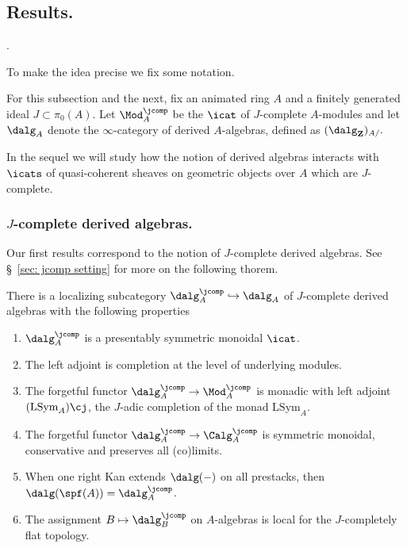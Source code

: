 \documentclass[10pt,reqno]{amsart}
\numberwithin{equation}{section}
\newcommand{\ZZ}{\mathbf{Z}}
\newcommand{\Sym}{\mathrm{Sym}}
\renewcommand{\L}{\mathrm{L}}
\newcommand{\into}{\hookrightarrow}
\begin{document}
\subsection{Results.}\label{sec: results}





.

To make the idea precise we fix some notation.

\begin{notation}\label{notation in intro.}
    For this subsection and the next, fix an animated ring $A$ and a finitely generated ideal $J\subset \pi_0(A).$ Let $\Mod_A^\jcomp$ be the $\icat$ of $J$-complete $A$-modules and let $\dalg_A$ denote the $\infty$-category of derived $A$-algebras, defined as $(\dalg_\ZZ)_{A/}.$
\end{notation}

In the sequel we will study how the notion of derived algebras interacts with $\icats$ of quasi-coherent sheaves on geometric objects over $A$ which are $J$-complete.

\subsubsection{$J$-complete derived algebras.}
Our first results correspond to the notion of $J$-complete derived algebras. See  \S~\ref{sec: jcomp setting} for more on the following thorem.



\begin{theorem}
    There is a localizing subcategory $\dalg_A^\jcomp\into \dalg_A$ of $J$-complete derived algebras with the following properties
    \begin{enumerate}
    \item $\dalg_A^\jcomp$ is a presentably symmetric monoidal $\icat$.
        \item The left adjoint is completion at the level of underlying modules.
        \item The forgetful functor $\dalg_A^\jcomp\to \Mod_A^\jcomp$ is monadic with left adjoint $(\L\Sym_A)\cj$, the $J$-adic completion of the monad $\L\Sym_A.$
        \item The forgetful functor $\dalg_A^\jcomp\to \Calg_A^\jcomp$ is symmetric monoidal, conservative and preserves all (co)limits.
        \item  When one right Kan extends $\dalg(-)$ on all prestacks, then $\dalg(\spf(A))=\dalg_A^\jcomp$.
        \item The assignment $B\mapsto \dalg^\jcomp_B$ on $A$-algebras is local for the $J$-completely flat topology.
    \end{enumerate}
\end{theorem}
\end{document}
